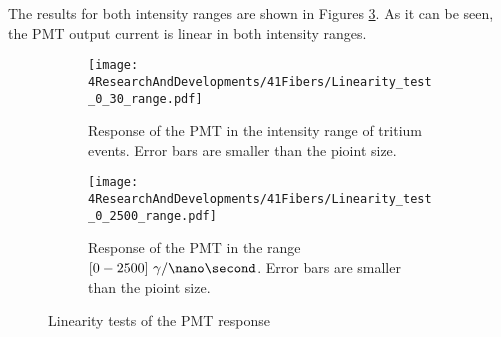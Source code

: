The results for both intensity ranges are shown in Figures \ref{fig:LinearityRangesOfPMT}. As it can be seen, the PMT output current is linear in both intensity ranges.

\begin{figure}
\centering
    \begin{subfigure}[b]{1\textwidth}
    \centering
    \texttt{[image: 4ResearchAndDevelopments/41Fibers/Linearity\_test\_0\_30\_range.pdf]}  
    \caption{Response of the PMT in the intensity range of tritium events. Error bars are smaller than the pioint size. \label{subfig:LinearityTritiumRange}}
    \end{subfigure}
    \hfill
    \begin{subfigure}[b]{1\textwidth}
    \centering
    \texttt{[image: 4ResearchAndDevelopments/41Fibers/Linearity\_test\_0\_2500\_range.pdf]}  
    \caption{Response of the PMT in the range $[0-2500]~\gamma/\nano\second$. Error bars are smaller than the pioint size. \label{subfig:LinearityStudyRange}}
    \end{subfigure}
 \caption{Linearity tests of the PMT response}
 \label{fig:LinearityRangesOfPMT}
\end{figure}